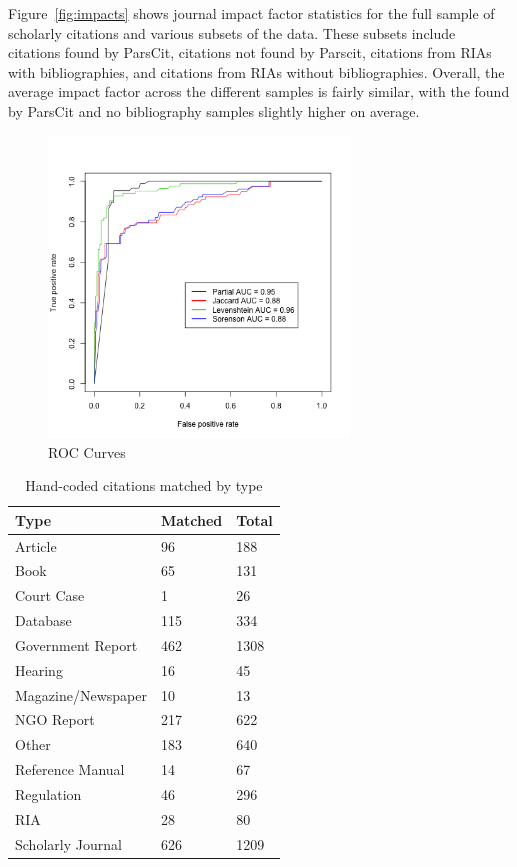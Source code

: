 \documentclass[12pt]{article}
\begin{document}
Figure~\ref{fig:impacts} shows journal impact factor statistics for the full sample of scholarly citations and various subsets of the data. These subsets include citations found by ParsCit, citations not found by Parscit, citations from RIAs with bibliographies, and citations from RIAs without bibliographies. Overall, the average impact factor across the different samples is fairly similar, with the found by ParsCit and no bibliography samples slightly higher on average.\\

\begin{figure}
\begin{center}
\includegraphics[height=8cm]{roc_curves.png}
\caption{ROC Curves}
\label{fig:roc}
\end{center}
\end{figure}

\begin{table}[ht]
\centering
\caption{Hand-coded citations matched by type}\label{tab:focalhand}
\begin{tabular}{lll}
  \hline
  \hline
 Type & Matched & Total\\
 \hline
Article & 96 & 188 \\
Book & 65 & 131\\
Court Case & 1 & 26\\
Database & 115 & 334\\
Government Report & 462 & 1308\\
Hearing & 16 & 45\\
Magazine/Newspaper & 10 & 13\\
NGO Report & 217 & 622 \\
Other & 183 & 640\\
Reference Manual & 14 & 67\\
Regulation & 46 & 296\\
RIA & 28 & 80\\
Scholarly Journal & 626 & 1209\\
  \hline
  \hline
\end{tabular}
\end{table}
\end{document}
